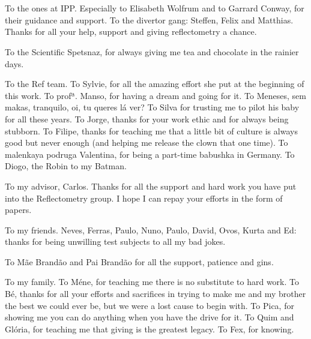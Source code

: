 
\section*{\acknowledgments}


To the ones at IPP. Especially to Elisabeth Wolfrum and to Garrard Conway, for their guidance and support. To the divertor gang: Steffen, Felix and Matthias. Thanks for all your help, support and giving reflectometry a chance.

To the Scientific Spetsnaz, for always giving me tea and chocolate in the rainier days.

To the Ref team. To Sylvie, for all the amazing effort she put at the beginning of this work. To profª. Manso, for having a dream and going for it. To Meneses, sem makas, tranquilo, oi, tu queres lá ver? To Silva for trusting me to pilot his baby for all these years. To Jorge, thanks for your work ethic and for always being stubborn. To Filipe, thanks for teaching me that a little bit of culture is always good but never enough (and helping me release the clown that one time). To malenkaya podruga Valentina, for being a part-time babushka in Germany. To Diogo, the Robin to my Batman.

To my advisor, Carlos. Thanks for all the support and hard work you have put into the Reflectometry group. I hope I can repay your efforts in the form of papers. 

To my friends. Neves, Ferras, Paulo, Nuno, Paulo, David, Ovos, Kurta and Ed: thanks for being unwilling test subjects to all my bad jokes.

To Mãe Brandão and Pai Brandão for all the support, patience and gins.

To my family. To Méne, for teaching me there is no substitute to hard work. To Bé, thanks for all your efforts and sacrifices in trying to make me and my brother the best we could ever be, but we were a lost cause to begin with. To Pica, for showing me you can do anything when you have the drive for it. To Quim and Glória, for teaching me that giving is the greatest legacy. To Fex, for knowing.

